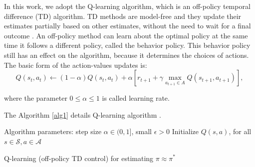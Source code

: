 In this work, we adopt the Q-learning algorithm, which is an off-policy temporal difference (TD) algorithm.
%
TD methods are model-free and they update their estimates partially based on other estimates, without the need to wait for a final outcome \cite{sutton2018rl}.
%
An off-policy method can learn about the optimal policy at the same time it follows a different policy, called the behavior policy.
%
This behavior policy still has an effect on the algorithm, because it determines the choices of actions. The basic form of the action-values updates is:
\begin{equation}\label{QlearningEq}
    Q\left(s_{t}, a_{t}\right) \leftarrow  (1-\alpha) Q\left(s_{t}, a_{t}\right)
    +\alpha\left[r_{t+1}+\gamma \max _{a_{t+1} \in A} Q\left(s_{t+1}, a_{t+1}\right)\right],
\end{equation}

\noindent where the parameter $0 \leq \alpha \leq 1$ is called learning rate.

The Algorithm \ref{alg1} details Q-learning algorithm \cite{sutton2018rl}.

\begin{algorithm}[htb]

Algorithm parameters: step size $\alpha \in (0, 1]$, small $\epsilon > 0$\;
Initialize $Q(s, a)$, for all $s \in \mathcal{S}, a \in \mathcal{A}$\;
\caption{Q-learning (off-policy TD control) for estimating $\pi \approx \pi^* $}
  \label{alg1}
\end{algorithm}
